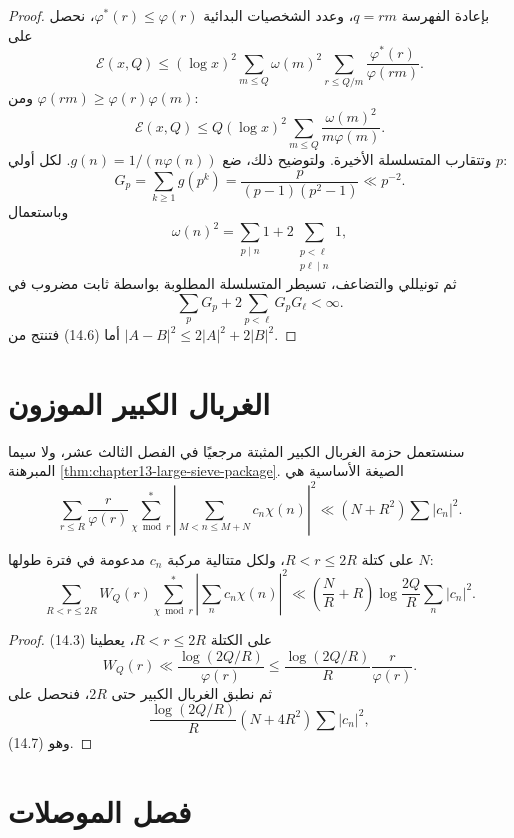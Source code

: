 \begin{proof}
بإعادة الفهرسة \(q=rm\)، وعدد الشخصيات البدائية
\(\varphi^*(r)\le\varphi(r)\)، نحصل على
\[
\mathcal E(x,Q)
\le
(\log x)^2
\sum_{m\le Q}\omega(m)^2
\sum_{r\le Q/m}\frac{\varphi^*(r)}{\varphi(rm)}.
\]
ومن \(\varphi(rm)\ge\varphi(r)\varphi(m)\):
\[
\mathcal E(x,Q)
\le
Q(\log x)^2
\sum_{m\le Q}\frac{\omega(m)^2}{m\varphi(m)}.
\]
وتتقارب المتسلسلة الأخيرة. ولتوضيح ذلك، ضع
\(g(n)=1/(n\varphi(n))\). لكل أولي \(p\):
\[
G_p=\sum_{k\ge1}g(p^k)
=
\frac{p}{(p-1)(p^2-1)}\ll p^{-2}.
\]
وباستعمال
\[
\omega(n)^2
=
\sum_{p\mid n}1
+2\sum_{\substack{p<\ell\\p\ell\mid n}}1,
\]
ثم تونيللي والتضاعف، تسيطر المتسلسلة المطلوبة بواسطة ثابت مضروب في
\[
\sum_pG_p+2\sum_{p<\ell}G_pG_\ell<\infty.
\]
أما (14.6) فتنتج من \(|A-B|^2\le2|A|^2+2|B|^2\).
\end{proof}

\section{الغربال الكبير الموزون}

سنستعمل حزمة الغربال الكبير المثبتة مرجعيًا في الفصل الثالث عشر، ولا سيما
المبرهنة \ref{thm:chapter13-large-sieve-package}. الصيغة الأساسية هي
\[
\sum_{r\le R}\frac r{\varphi(r)}
\sum_{\chi\bmod r}^{*}
\left|\sum_{M<n\le M+N}c_n\chi(n)\right|^2
\ll
(N+R^2)\sum|c_n|^2.
\]

\begin{lemma}
\label{lem:chapter14-weighted-large-sieve}
على كتلة \(R<r\le2R\)، ولكل متتالية مركبة \(c_n\) مدعومة في فترة طولها
\(N\):
\[
\sum_{R<r\le2R}W_Q(r)
\sum_{\chi\bmod r}^{*}
\left|\sum_n c_n\chi(n)\right|^2
\ll
\left(\frac NR+R\right)
\log\frac{2Q}{R}
\sum_n|c_n|^2.
\tag{14.7}
\]
\end{lemma}

\begin{proof}
على الكتلة \(R<r\le2R\)، يعطينا (14.3)
\[
W_Q(r)
\ll
\frac{\log(2Q/R)}{\varphi(r)}
\le
\frac{\log(2Q/R)}{R}\frac r{\varphi(r)}.
\]
ثم نطبق الغربال الكبير حتى \(2R\)، فنحصل على
\[
\frac{\log(2Q/R)}{R}(N+4R^2)\sum|c_n|^2,
\]
وهو (14.7).
\end{proof}

\section{فصل الموصلات}

